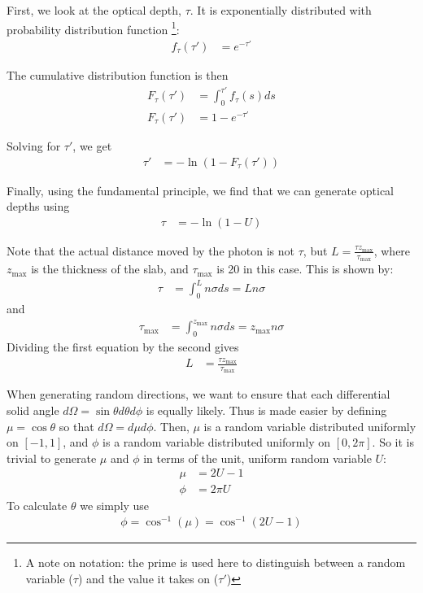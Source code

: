 \documentclass[twocolumn]{myarticle}
\begin{document}
First, we look at the optical depth, $ \tau $.
It is exponentially distributed with probability distribution function
\footnote{A note on notation: the prime is used here to distinguish between a random variable ($ \tau $) and the value it takes on ($ \tau' $)}:
\begin{align}
    f_\tau(\tau') &= e^{-\tau'}
\end{align}

The cumulative distribution function is then
\begin{align}
    F_\tau (\tau') &= \int_0^{\tau'} f_\tau (s) d s
    \\
    F_\tau (\tau') &= 1 - e^{-\tau'}
\end{align}

Solving for $ \tau' $, we get
\begin{align}
    \tau' &= - \ln \left( 1 - F_\tau(\tau') \right)
\end{align}

Finally, using the fundamental principle, we find that we can generate optical depths using
\begin{align}
    \tau &= - \ln \left( 1 - U \right)
\end{align}

Note that the actual distance moved by the photon is not $ \tau $, but $ L = \frac{\tau z_\text{max}}{\tau_\text{max}} $, where $ z_\text{max} $ is the thickness of the slab, and $ \tau_\text{max} $ is 20 in this case.
This is shown by:
\begin{align}
    \tau &= \int_0^L n \sigma ds = L n \sigma
\end{align}
and
\begin{align}
    \tau_\text{max} &= \int_0^{z_\text{max}} n \sigma ds = z_\text{max} n \sigma
\end{align}
Dividing the first equation by the second gives
\begin{align}
    L &= \frac{\tau z_\text{max}}{\tau_\text{max}}
\end{align}

When generating random directions, we want to ensure that each differential solid angle $ d \Omega = \sin \theta d \theta d \phi $ is equally likely.
Thus is made easier by defining $ \mu = \cos \theta $ so that $ d \Omega = d \mu d \phi $.
Then, $ \mu $ is a random variable distributed uniformly on $ [-1, 1] $, and $ \phi $ is a random variable distributed uniformly on $ [0, 2\pi] $.
So it is trivial to generate $ \mu $ and $ \phi $ in terms of the unit, uniform random variable $ U $:
\begin{align}
    \mu &= 2U - 1
    \\
    \phi &= 2\pi U
\end{align}
To calculate $ \theta $ we simply use
\begin{align}
    \phi = \cos^{-1} (\mu) = \cos^{-1}(2U-1) 
\end{align}
\end{document}
